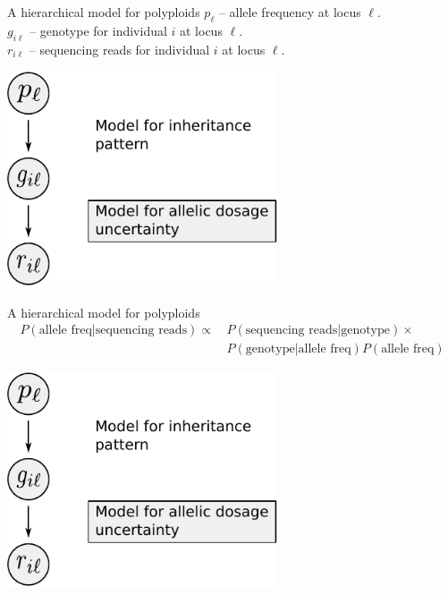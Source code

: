 \documentclass[presentation]{beamer}
\begin{document}
\begin{frame}[c]{A hierarchical model for polyploids}
	$p_{\ell}$ -- allele frequency at locus $\ell$. \\
	$g_{i \ell}$ -- genotype for individual $i$ at locus $\ell$. \\
	$r_{i \ell}$ -- sequencing reads for individual $i$ at locus $\ell$.
	\vspace{0.1in}
	\begin{center}
		\includegraphics[width=0.6\textwidth]{fig/figure1-model-graph}
	\end{center}
\end{frame}

\begin{frame}[t]{A hierarchical model for polyploids}
	\vspace{-0.182in}
	\begin{align*}
		P(\text{allele freq} \vert \text{sequencing reads}) \propto\, &P(\text{sequencing reads} \vert \text{genotype}) \times\\
		&P(\text{genotype} \vert \text{allele freq})P(\text{allele freq})
	\end{align*}
		
	\begin{center}
		\includegraphics[width=0.6\textwidth]{fig/figure1-model-graph}
	\end{center}
\end{frame}
\end{document}

